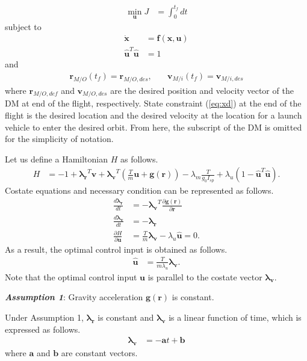 \documentclass{fdclreport}
\begin{document}
\begin{align}
	\min_{\bm{u}} J &= \int_{0}^{t_{f}} dt \label{eq:J}
\end{align}
subject to
\begin{align}
	\dot{\bm{x}} &= \bm{f(x, u)} \label{eq:ode} \\ 
	\bm{\hat{u}}^T\bm{\hat{u}} &= 1
\end{align}
and
\begin{align}
	\bm{r}_{M/O}(t_f) = \bm{r}_{M/O, des},& \quad \bm{v}_{M/i}(t_f) = \bm{v}_{M/i, des}  \label{eq:xd}
\end{align}
where $\bm{r}_{M/O, def}$ and $\bm{v}_{M/O, des}$ are the desired position and velocity vector of the DM at end of the flight, respectively.
State constraint (\ref{eq:xd}) at the end of the flight is the desired location and the desired velocity at the location for a launch vehicle to enter the desired orbit.
From here, the subscript of the DM is omitted for the simplicity of notation.

Let us define a Hamiltonian $H$ as follows.
\begin{align}
	H &= -1 + \bm{\lambda_r}^T \bm{v} + \bm{\lambda_v}^T (\frac{T}{m}\bm{u} + \bm{g}(\bm{r})) -\lambda_m \frac{T}{g_0 I_{sp}} + \lambda_u (1-\bm{\hat{u}}^T \bm{\hat{u}}).
\end{align}
Costate equations and necessary condition can be represented as follows.
\begin{align}
	\frac{d \bm{\lambda_r}}{dt} &= - \bm{\lambda_v}^T \frac{\partial \bm{g}(\bm{r})}{\partial \bm{r}} \\
	\frac{d \bm{\lambda_v}}{dt} &= -\bm{\lambda_r} \\ 
	\frac{\partial H}{\partial \bm{u}} &= \frac{T}{m} \bm{\lambda_v} - \lambda_u \bm{\hat{u}} = 0.
\end{align}
As a result, the optimal control input is obtained as follows.
\begin{align}
	\bm{\hat{u}} &= \frac{T}{m \lambda_u} \bm{\lambda_v}.
\end{align}
Note that the optimal control input $\bm{u}$ is parallel to the costate vector $\bm{\lambda_v}$.

\textbf{\emph{Assumption 1}}: Gravity acceleration $\bm{g}(\bm{r})$ is constant.

Under Assumption 1, $\bm{\lambda_r}$ is constant and $\bm{\lambda_v}$ is a linear function of time, which is expressed as follows.
\begin{align}
	\bm{\lambda_v} &= -\bm{a} t + \bm{b}
\end{align}
where $\bm{a}$ and $\bm{b}$ are constant vectors.
\end{document}
